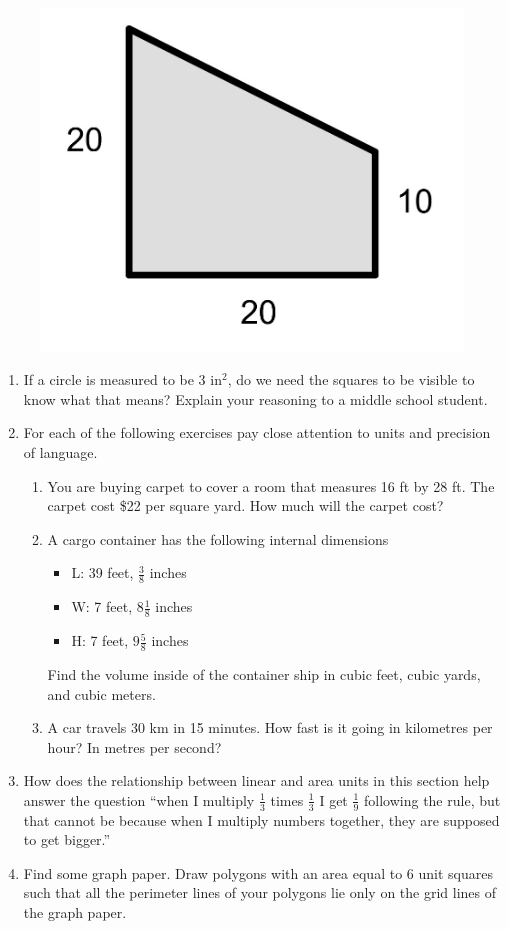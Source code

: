 \documentclass[
]{book}
\providecommand{\tightlist}{%
  \setlength{\itemsep}{0pt}\setlength{\parskip}{0pt}}
\theoremstyle{definition}
\theoremstyle{definition}
\theoremstyle{definition}
\theoremstyle{definition}
\theoremstyle{remark}
\begin{document}
\begin{figure}

{\centering \includegraphics[width=0.2\linewidth]{images/field} 

}

\end{figure}

\begin{enumerate}
\def\labelenumi{\arabic{enumi}.}
\item
  If a circle is measured to be 3 in\(^2\), do we need the squares to be visible to know what that means? Explain your reasoning to a middle school student.
\item
  For each of the following exercises pay close attention to units and precision of language.

  \begin{enumerate}
  \def\labelenumii{\alph{enumii}.}
  \tightlist
  \item
    You are buying carpet to cover a room that measures 16 ft by 28 ft. The carpet cost \$22 per square yard. How much will the carpet cost?
  \item
    A cargo container has the following internal dimensions

    \begin{itemize}
    \tightlist
    \item
      L: 39 feet, \(\frac{3}{8}\) inches
    \item
      W: 7 feet, \(8 \frac{1}{8}\) inches
    \item
      H: 7 feet, \(9 \frac{5}{8}\) inches
    \end{itemize}

    Find the volume inside of the container ship in cubic feet, cubic yards, and cubic meters.
  \item
    A car travels 30 km in 15 minutes. How fast is it going in kilometres per hour? In metres per second?
  \end{enumerate}
\item
  How does the relationship between linear and area units in this section help answer the question ``when I multiply \(\frac{1}{3}\) times \(\frac{1}{3}\) I get \(\frac{1}{9}\) following the rule, but that cannot be because when I multiply numbers together, they are supposed to get bigger.''
\item
  Find some graph paper. Draw polygons with an area equal to 6 unit squares such that all the perimeter lines of your polygons lie only on the grid lines of the graph paper.


\end{enumerate}
\end{document}
